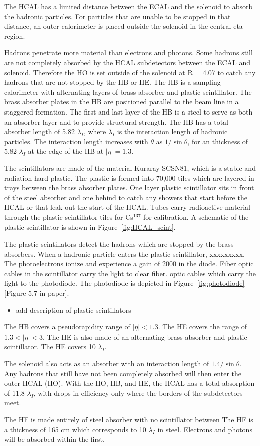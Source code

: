 The HCAL has a limited distance between the ECAL and the solenoid to absorb the hadronic particles. For particles that are unable to be stopped in that distance, an outer calorimeter is placed outside the solenoid in the central eta region.




Hadrons penetrate more material than electrons and photons. Some hadrons still are not completely absorbed by the HCAL subdetectors between the ECAL and solenoid. Therefore the HO is set outside of the solenoid at R = 4.07 to catch any hadrons that are not stopped by the HB or HE. The HB is a sampling calorimeter with alternating layers of brass absorber and plastic scintillator. The brass absorber plates in the HB are positioned parallel to the beam line in a staggered formation. The first and last layer of the HB is a steel to serve as both an absorber layer and to provide structural strength. The HB has a total absorber length of 5.82 $\lambda_I$, where $\lambda_I$ is the interaction length of hadronic particles. The interaction length increases with $\theta$ as $1/\sin{\theta}$, for an thickness of 5.82 $\lambda_I$ at the edge of the HB at $|\eta| = 1.3$.

The scintillators are made of the material Kuraray SCSN81, which is a stable and radiation hard plastic. The plastic is formed into 70,000 tiles which are layered in trays between the brass absorber plates. One layer plastic scintillator sits in front of the steel absorber and one behind to catch any showers that start before the HCAL or that leak out the start of the HCAL. Tubes carry radioactive material through the plastic scintillator tiles for Cs$^{137}$ for calibration. A schematic of the plastic scintillator is shown in Figure~\ref{fig:HCAL_scint}.

The plastic scintillators detect the hadrons which are stopped by the brass absorbers. When a hadronic particle enters the plastic scintillator, xxxxxxxxx. The photoelectrons ionize and experience a gain of 2000 in the diode. Fiber optic cables in the scintillator carry the light to clear fiber. optic cables which carry the light to the photodiode. The photodiode is depicted in Figure~\ref{fig:photodiode} [Figure 5.7 in paper].

\begin{itemize}
	\item add description of plastic scintillators
\end{itemize}

The HB covers a pseudorapidity range of $|\eta| < 1.3$. The HE covers the range of $1.3 < |\eta| < 3$. The HE is also made of an alternating brass absorber and plastic scintillator. The HE covers 10 $\lambda_I$.

The solenoid also acts as an absorber with an interaction length of $1.4/\sin{\theta}$. Any hadrons that still have not been completely absorbed will then enter the outer HCAL (HO). With the HO, HB, and HE, the HCAL has a total absorption of 11.8 $\lambda_I$, with drops in efficiency only where the borders of the subdetectors meet.

The HF is made entirely of steel absorber with no scintillator between The HF is a thickness of 165 cm which corresponds to 10 $\lambda_I$ in steel. Electrons and photons will be absorbed within the first.